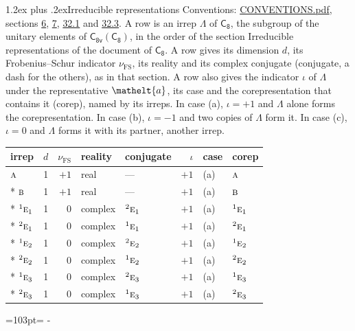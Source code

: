\documentclass[10pt,a4paper]{article}
\makeatletter
\renewcommand\section{\@startsection{section}{1}{\z@}{-3ex plus -1ex minus -.2ex}%
  {1.2ex plus .2ex}{\normalfont\large\sffamily\bfseries\color{parttitle}}}
\newcommand{\needspace}[1]{\par\penalty-100\begingroup\dimen0=#1\relax\dimen2=\pagegoal
  \advance\dimen2-\pagetotal\ifdim\dimen0>\dimen2\relax\ifdim\dimen2>0pt\vfil\break\fi\fi
  \endgroup}
\numberwithin{equation}{section}
\newcommand{\eltfont}[1]{{\let\sigma\eltsigma\mathelt{#1}}}
\newcommand{\grp}[1]{\mathsf{#1}}
\newcommand{\irr}[1]{\text{\normalfont\scshape #1}}
\newcommand{\conjpair}[1]{{}^{#1}}
\newcommand{\elt}[1]{\eltfont{#1}}
\newcommand{\fsind}{\nu_{\mathrm{FS}}}
\makeatother
\begin{document}
\section{Irreducible representations}\label{s:irreps}
Conventions: \href{../../CONVENTIONS.pdf}{CONVENTIONS.pdf}, sections \href{../../../rotation/CONVENTIONS.pdf\#conv.6}{6}, \href{../../../rotation/CONVENTIONS.pdf\#conv.7}{7}, \href{../../CONVENTIONS.pdf\#conv.32.1}{32.1} and \href{../../CONVENTIONS.pdf\#conv.32.3}{32.3}.
\leavevmode\label{n:irrep.Delta}A row is an irrep $\Lambda$ of $\grp{C_{8}}$, the subgroup of the unitary elements of $\grp{C_{8v}}(\grp{C_{8}})$, in the order of the section Irreducible representations of the document of \href{../../../rotation/data/pdf/C8.pdf}{$\grp{C_{8}}$}. \label{n:index.dimension}\label{n:index.frobenius}\label{n:head.irrep}\label{n:head.reality}\label{n:head.conjugate}A row gives its dimension $d$, its Frobenius--Schur indicator $\fsind$, its reality and its complex conjugate (conjugate, a dash for the others), as in that section. \label{n:head.case.corep}\label{n:head.corep}A row also gives the indicator $\iota$ of $\Lambda$ under the representative $\elt{a}$, its case and the corepresentation that contains it (corep), named by its irreps. In case (a), $\iota = +1$ and $\Lambda$ alone forms the corepresentation. In case (b), $\iota = -1$ and two copies of $\Lambda$ form it. In case (c), $\iota = 0$ and $\Lambda$ forms it with its partner, another irrep.
\setlength{\emergencystretch}{2em}\par\setlength{\emergencystretch}{0pt}
{\small\renewcommand{\arraystretch}{1.25}\setlength{\tabcolsep}{4pt}\begin{longtable}{@{}lrrllrll@{}}\toprule
irrep & $d$ & $\fsind$ & reality & conjugate & $\iota$ & case & corep\\\midrule\endhead
\bottomrule\endfoot\endlastfoot
$\irr{a}$ & 1 & $+1$ & real & --- & $+1$ & (a) & $\irr{a}$\\*
$\irr{b}$ & 1 & $+1$ & real & --- & $+1$ & (a) & $\irr{b}$\\*
$\conjpair{1}\irr{e}_{1}$ & 1 & $0$ & complex & $\conjpair{2}\irr{e}_{1}$ & $+1$ & (a) & $\conjpair{1}\irr{e}_{1}$\\*
$\conjpair{2}\irr{e}_{1}$ & 1 & $0$ & complex & $\conjpair{1}\irr{e}_{1}$ & $+1$ & (a) & $\conjpair{2}\irr{e}_{1}$\\*
$\conjpair{1}\irr{e}_{2}$ & 1 & $0$ & complex & $\conjpair{2}\irr{e}_{2}$ & $+1$ & (a) & $\conjpair{1}\irr{e}_{2}$\\*
$\conjpair{2}\irr{e}_{2}$ & 1 & $0$ & complex & $\conjpair{1}\irr{e}_{2}$ & $+1$ & (a) & $\conjpair{2}\irr{e}_{2}$\\*
$\conjpair{1}\irr{e}_{3}$ & 1 & $0$ & complex & $\conjpair{2}\irr{e}_{3}$ & $+1$ & (a) & $\conjpair{1}\irr{e}_{3}$\\*
$\conjpair{2}\irr{e}_{3}$ & 1 & $0$ & complex & $\conjpair{1}\irr{e}_{3}$ & $+1$ & (a) & $\conjpair{2}\irr{e}_{3}$\\
\bottomrule\end{longtable}}
\needspace{103pt}
\end{document}
